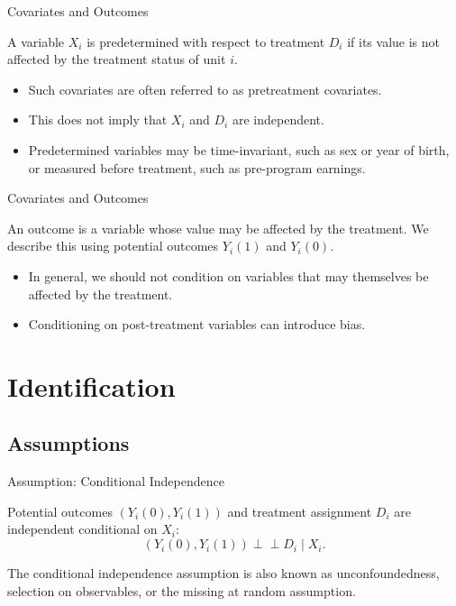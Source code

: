 \documentclass[11pt,aspectratio=169]{beamer}
\begin{document}
\begin{frame}{Covariates and Outcomes}

\begin{definitionbox}
A variable $X_i$ is predetermined with respect to treatment $D_i$ if its value is not affected by the treatment status of unit $i$.
\end{definitionbox}
\begin{itemize}
    \item Such covariates are often referred to as pretreatment covariates.
    \item This does not imply that $X_i$ and $D_i$ are independent.
    \item Predetermined variables may be time-invariant, such as sex or year of birth, or measured before treatment, such as pre-program earnings.
\end{itemize}
\end{frame}


\begin{frame}{Covariates and Outcomes}

\begin{definitionbox}
An outcome is a variable whose value may be affected by the treatment. We describe this using potential outcomes $Y_i(1)$ and $Y_i(0)$.
\end{definitionbox}
\begin{itemize}
    \item In general, we should not condition on variables that may themselves be affected by the treatment.
    \item Conditioning on post-treatment variables can introduce bias.
\end{itemize}

\end{frame}



\section{Identification}
\subsection{Assumptions}

\begin{frame}


\end{frame}


\begin{frame}{Assumption: Conditional Independence}

\begin{definitionbox}
Potential outcomes $(Y_i(0), Y_i(1))$ and treatment assignment $D_i$ are independent conditional on $X_i$:
$$(Y_i(0), Y_i(1)) \perp\!\!\!\perp D_i \mid X_i.$$
\end{definitionbox}
The conditional independence assumption is also known as unconfoundedness, selection on observables, or the missing at random assumption.
\end{frame}
\end{document}
